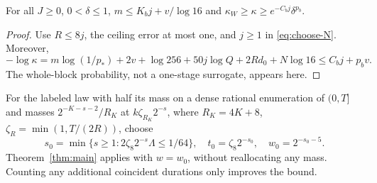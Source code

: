 \begin{proposition}
\label{prop:envelope}
For all $J\ge0$, $0<\delta\le1$,
$m\le K_bj+v/\log16$ and $\kappa_W\ge\kappa\ge e^{-C_bj}\delta^{p_b}$.
\end{proposition}
\begin{proof}
Use $R\le8j$, the ceiling error at most one, and $j\ge1$ in
\eqref{eq:choose-N}. Moreover,
\[
 -\log\kappa=m\log(1/p_*)+2v+\log256+50j\log Q+2Rd_0+N\log16
 \le C_bj+p_bv.
\]
The whole-block probability, not a one-stage surrogate, appears here.
\end{proof}

\begin{corollary}
\label{cor:original}
For the labeled law with half its mass on a dense rational enumeration of
$(0,T]$ and masses $2^{-K-s-2}/R_K$ at
$k\zeta_{R_K}2^{-s}$, where $R_K=4K+8$,
$\zeta_R=\min(1,T/(2R))$, choose
\[
 s_0=\min\{s\ge1:2\zeta_8 2^{-s}\Lambda\le1/64\},\quad
 t_0=\zeta_8 2^{-s_0},\quad w_0=2^{-s_0-5}.
\]
Theorem~\ref{thm:main} applies with $w=w_0$, without reallocating any mass.
Counting any additional coincident durations only improves the bound.
\end{corollary}
